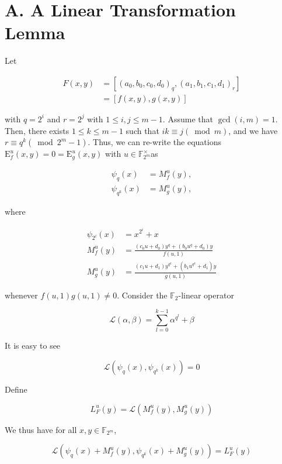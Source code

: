 \documentclass[10pt]{article}
\begin{document}
\section*{A. A Linear Transformation Lemma}
Let

$$
\begin{aligned}
F(x, y) & =\left[\left(a_{0}, b_{0}, c_{0}, d_{0}\right)_{q},\left(a_{1}, b_{1}, c_{1}, d_{1}\right)_{r}\right] \\
& =[f(x, y), g(x, y)]
\end{aligned}
$$

with $q=2^{i}$ and $r=2^{j}$ with $1 \leq i, j \leq m-1$. Assume that $\operatorname{gcd}(i, m)=1$. Then, there exists $1 \leq k \leq m-1$ such that $i k \equiv j(\bmod m)$, and we have $r \equiv q^{k}\left(\bmod 2^{m}-1\right)$. Thus, we can re-write the equations $\mathrm{E}_{f}^{u}(x, y)=0=\mathrm{E}_{g}^{u}(x, y)$ with $u \in \mathbb{F}_{2^{m}}^{\times}$as


\begin{align*}
\psi_{q}(x) & =M_{f}^{u}(y),  \tag{3}\\
\psi_{q^{k}}(x) & =M_{g}^{u}(y), \tag{4}
\end{align*}


where

$$
\begin{aligned}
\psi_{2^{i}}(x) & =x^{2^{i}}+x \\
M_{f}^{u}(y) & =\frac{\left(c_{0} u+d_{0}\right) y^{q}+\left(b_{0} u^{q}+d_{0}\right) y}{f(u, 1)} \\
M_{g}^{u}(y) & =\frac{\left(c_{1} u+d_{1}\right) y^{q^{k}}+\left(b_{1} u^{q^{k}}+d_{1}\right) y}{g(u, 1)}
\end{aligned}
$$

whenever $f(u, 1) g(u, 1) \neq 0$. Consider the $\mathbb{F}_{2}$-linear operator

$$
\mathcal{L}(\alpha, \beta)=\sum_{l=0}^{k-1} \alpha^{q^{l}}+\beta
$$

It is easy to see

$$
\mathcal{L}\left(\psi_{q}(x), \psi_{q^{k}}(x)\right)=0
$$

Define

$$
L_{F}^{u}(y)=\mathcal{L}\left(M_{f}^{u}(y), M_{g}^{u}(y)\right)
$$

We thus have for all $x, y \in \mathbb{F}_{2^{m}}$,


\begin{equation*}
\mathcal{L}\left(\psi_{q}(x)+M_{f}^{u}(y), \psi_{q^{k}}(x)+M_{g}^{u}(y)\right)=L_{F}^{u}(y) \tag{5}
\end{equation*}
\end{document}
